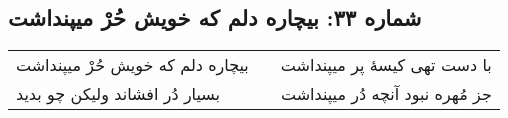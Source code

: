 \begin{center}
\section*{شماره ۳۳: بیچاره دلم که خویش حُرْ میپنداشت}
\label{sec:033}
\begin{longtable}{l p{0.5cm} r}
بیچاره دلم که خویش حُرْ میپنداشت
&&
با دست تهی کیسهٔ پر میپنداشت
\\
بسیار دُر افشاند ولیکن چو بدید
&&
جز مُهره نبود آنچه دُر میپنداشت
\\
\end{longtable}
\end{center}
